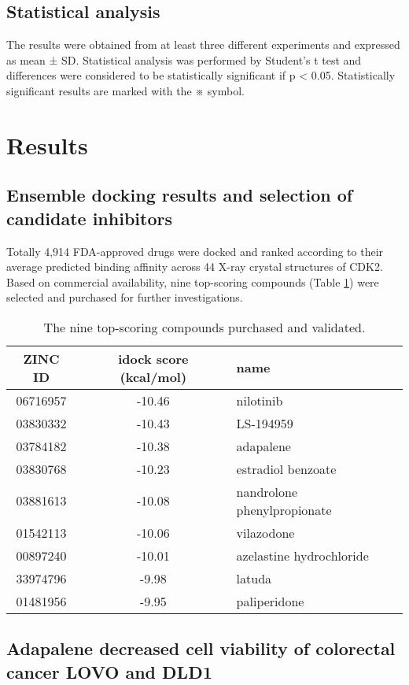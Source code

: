 \subsection{Statistical analysis}

The results were obtained from at least three different experiments and expressed as mean ± SD. Statistical analysis was performed by Student’s t test and differences were considered to be statistically significant if p < 0.05. Statistically significant results are marked with the ※ symbol.

\section{Results}

\subsection{Ensemble docking results and selection of candidate inhibitors}

Totally 4,914 FDA-approved drugs were docked and ranked according to their average predicted binding affinity across 44 X-ray crystal structures of CDK2. Based on commercial availability, nine top-scoring compounds (Table \ref{cdk2:Top9}) were selected and purchased for further investigations.

\begin{table}
\caption{The nine top-scoring compounds purchased and validated.}
\label{cdk2:Top9}
\begin{tabular}{ccl}
\hline
ZINC ID & idock score (kcal/mol) & name\\
\hline
06716957 & -10.46 & nilotinib\\
03830332 & -10.43 & LS-194959\\
03784182 & -10.38 & adapalene\\
03830768 & -10.23 & estradiol benzoate\\
03881613 & -10.08 & nandrolone phenylpropionate\\
01542113 & -10.06 & vilazodone\\
00897240 & -10.01 & azelastine hydrochloride\\
33974796 &  -9.98 & latuda\\
01481956 &  -9.95 & paliperidone\\
\hline
\end{tabular}
\end{table}

\subsection{Adapalene decreased cell viability of colorectal cancer LOVO and DLD1}

